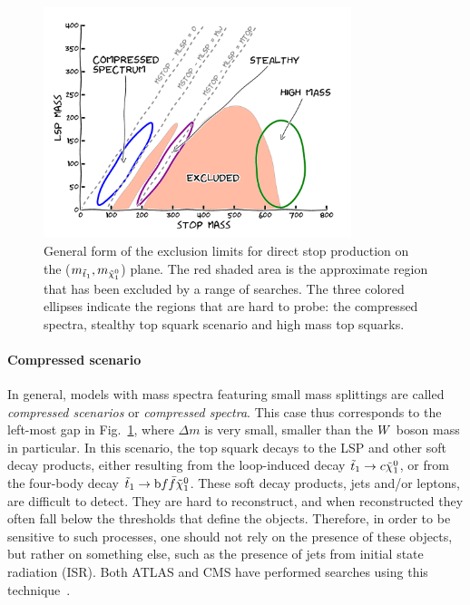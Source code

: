 \begin{figure}[htpb]
  \centering
  \includegraphics[width=0.8\textwidth]{figures/razor_motivation/story_boost_motivation}
  \caption{General form of the exclusion limits for direct stop production on the
($m_{\tilde{t}_1},m_{\tilde{\chi}_1^0}$) plane. The red shaded area is the approximate region that has been
excluded by a range of searches. The three colored ellipses indicate the regions that are hard to
probe: the compressed spectra, stealthy top squark scenario and high mass top squarks.
  \label{fig:boost_story_motivation}}
\end{figure}

\paragraph{Compressed scenario}
In general, models with mass spectra featuring small mass splittings are called \textit{compressed
scenarios} or \textit{compressed spectra}. This case thus corresponds to the left-most gap in
Fig.~\ref{fig:boost_story_motivation}, where $\Delta m$ is very small, smaller than the $W$ boson
mass in particular. 
In this scenario, the top squark decays to the LSP and other soft decay products, either resulting
from the loop-induced decay $\tilde{t}_1 \rightarrow c \tilde{\chi}_1^0$, or from the four-body decay $\tilde{t}_1
\rightarrow \mathrm{b} f \bar{f} \tilde{\chi}_1^0$. These soft decay products, jets and/or leptons, are difficult to
detect. They are hard to reconstruct, and when reconstructed they often fall below the \pt
thresholds that define the objects. 
Therefore, in order to be sensitive to such processes, one should not rely on the presence of
these objects, but rather on something else, such as the presence of jets from initial state
radiation (ISR). Both ATLAS and CMS have performed searches using this
technique~\cite{CMS-PAS-SUS-13-009,Aad:2014nra}. 

